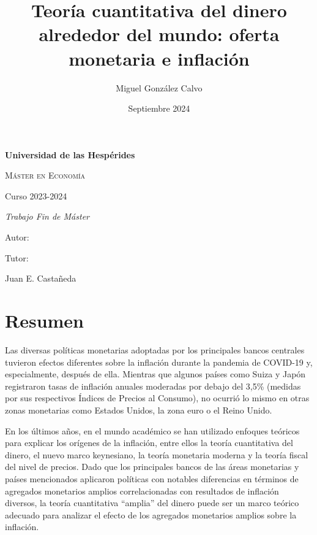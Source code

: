 \documentclass[titlepage, 12pt]{article}
\title{Teoría cuantitativa del dinero alrededor del mundo: oferta monetaria e inflación}
\author{Miguel González Calvo}
\date{Septiembre 2024}
\begin{document}
\begin{titlepage}
    \centering
    {\bfseries\LARGE Universidad de las Hespérides \par}
    \vspace{1cm}
    {\scshape\Large Máster en Economía \par}
    \vspace{0.5cm}
    {\Large Curso 2023-2024 \par}
    \vspace{3cm}
    {\scshape\Huge \@title \par}
    \vspace{3cm}
    {\itshape\Large Trabajo Fin de Máster \par}
    \vfill
    {\Large Autor: \par}
    {\Large \@author \par}
    \vspace{2cm}
    {\Large Tutor: \par}
    {\Large Juan E. Castañeda \par}
    \vfill
    {\Large \@date \par}
\end{titlepage}
\makeatother


\tableofcontents
\newpage
\listoffigures
\listoftables

\newpage
\section*{Resumen}
Las diversas políticas monetarias adoptadas por los principales bancos centrales tuvieron efectos diferentes sobre la inflación durante la pandemia de COVID-19 y, especialmente, después de ella. Mientras que algunos países como Suiza y Japón registraron tasas de inflación anuales moderadas por debajo del 3,5\% (medidas por sus respectivos Índices de Precios al Consumo), no ocurrió lo mismo en otras zonas monetarias como Estados Unidos, la zona euro o el Reino Unido.

En los últimos años, en el mundo académico se han utilizado enfoques teóricos para explicar los orígenes de la inflación, entre ellos la teoría cuantitativa del dinero, el nuevo marco keynesiano, la teoría monetaria moderna y la teoría fiscal del nivel de precios. Dado que los principales bancos de las áreas monetarias y países mencionados aplicaron políticas con notables diferencias en términos de agregados monetarios amplios correlacionadas con resultados de inflación diversos, la teoría cuantitativa \enquote{amplia} del dinero puede ser un marco teórico adecuado para analizar el efecto de los agregados monetarios amplios sobre la inflación.
\end{document}
